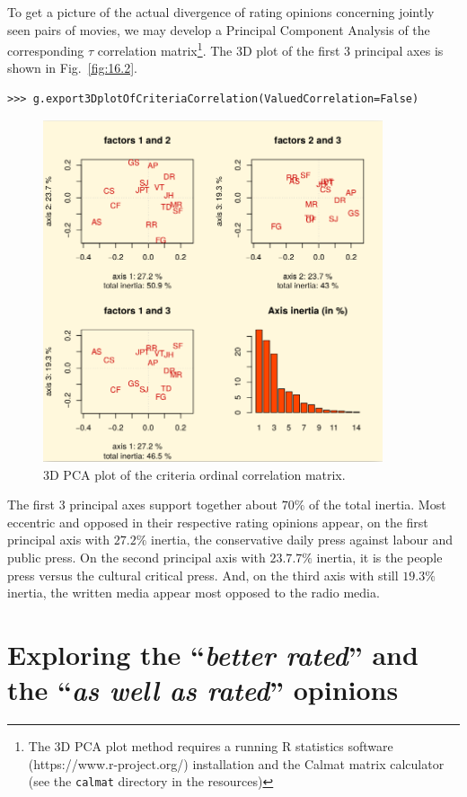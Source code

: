 To get a picture of the actual divergence of rating opinions concerning jointly seen pairs of movies, we may develop a Principal Component Analysis of the corresponding $\tau$ correlation matrix\footnote{The 3D PCA plot method requires a running R statistics software  (https://www.r-project.org/) installation and the Calmat matrix calculator (see the \texttt{calmat} directory in the \Digraph resources)}. The 3D plot of the first 3 principal axes is shown in Fig.~\vref{fig:16.2}.
\begin{lstlisting}
>>> g.export3DplotOfCriteriaCorrelation(ValuedCorrelation=False)
\end{lstlisting}
\begin{figure}[h]
\includegraphics[width=10cm]{Figures/correlationPCA.png}
\caption{3D PCA plot of the criteria ordinal correlation matrix.}
\label{fig:16.7}       %
\end{figure}
The first 3 principal axes support together about $70\%$ of the total inertia. Most eccentric and opposed in their respective rating opinions appear, on the first principal axis with $27.2\%$ inertia, the conservative daily press against labour and public press. On the second principal axis with $23.7.7\%$ inertia, it is the people press versus the cultural critical press. And, on the third axis with still $19.3\%$ inertia, the written media appear most opposed to the radio media.

\section{Exploring the ``\emph{better rated}''  and the ``\emph{as well as rated}'' opinions}
\label{sec:16.5}

